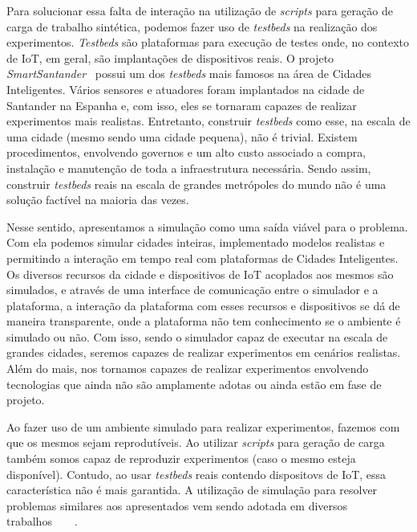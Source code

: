 Para solucionar essa falta de interação na utilização de \textit{scripts} para geração de carga de trabalho sintética, podemos fazer uso de \textit{testbeds} na realização dos experimentos.
\textit{Testbeds} são plataformas para execução de testes onde, no contexto de IoT, em geral, são implantações de dispositivos reais.
O projeto \textit{SmartSantander}~\cite{sanchez_2014} possui um dos \textit{testbeds} mais famosos na área de Cidades Inteligentes.
Vários sensores e atuadores foram implantados na cidade de Santander na Espanha e, com isso, eles se tornaram capazes de realizar experimentos mais realistas.
Entretanto, construir \textit{testbeds} como esse, na escala de uma cidade (mesmo sendo uma cidade pequena), não é trivial.
Existem procedimentos, envolvendo governos e um alto custo associado a compra, instalação e manutenção de toda a infraestrutura necessária.
Sendo assim, construir \textit{testbeds} reais na escala de grandes metrópoles do mundo não é uma solução factível na maioria das vezes.

Nesse sentido, apresentamos a simulação como uma saída viável para o problema.
Com ela podemos simular cidades inteiras, implementado modelos realistas e permitindo a interação em tempo real com plataformas de Cidades Inteligentes.
Os diversos recursos da cidade e dispositivos de IoT acoplados aos mesmos são simulados, e através de uma interface de comunicação entre o simulador e a plataforma, a interação da plataforma com esses
recursos e dispositivos se dá de maneira transparente, onde a plataforma não tem conhecimento se o ambiente é simulado ou não.
Com isso, sendo o simulador capaz de executar na escala de grandes cidades, seremos capazes de realizar experimentos em cenários realistas.
Além do mais, nos tornamos capazes de realizar experimentos envolvendo tecnologias que ainda não são amplamente adotas ou ainda estão em fase de projeto.

Ao fazer uso de um ambiente simulado para realizar experimentos, fazemos com que os mesmos sejam reprodutíveis.
Ao utilizar \textit{scripts} para geração de carga também somos capaz de reproduzir experimentos (caso o mesmo esteja disponível).
Contudo, ao usar \textit{testbeds} reais contendo dispositovs de IoT, essa característica não é mais garantida.
A utilização de simulação para resolver problemas similares aos apresentados vem sendo adotada em diversos trabalhos~\cite{karnouskos_2009}~\cite{fleischer_1994}~\cite{dupuy_1990}~\cite{boukerche_2001}.

